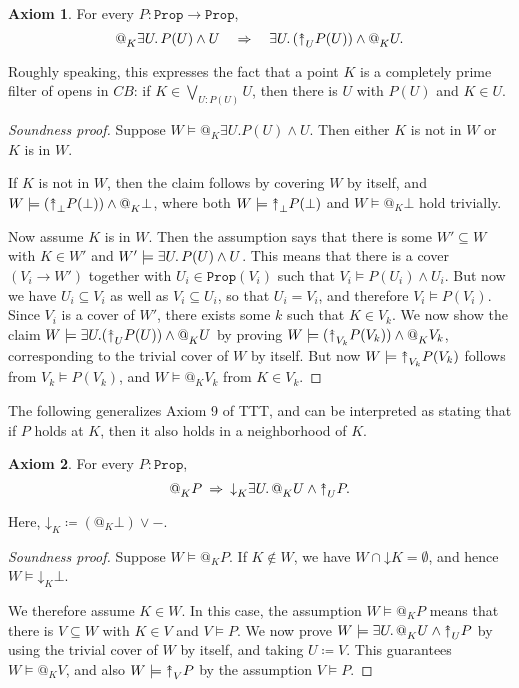\documentclass[11pt, oneside, article]{memoir}
\makeatletter
\theoremstyle{plain}
\theoremstyle{definition}
\newtheorem{axiom}{Axiom}
\theoremstyle{remark}
\newenvironment{soundproof}{\begin{proof}[Soundness proof]}{\end{proof}}
\newcommand{\const}[1]{\mathtt{#1}}
\newcommand{\Prop}{\const{Prop}}
\newcommand{\BaseSpace}{B}
\newcommand{\AtSymbol}{{@}}
\newcommand{\SeeSymbol}{{\down}}  %
\newcommand{\InSymbol}{{\upclose}}%
\newcommand{\At}[2][]{\AtSymbol^{#1}_{#2}}
\newcommand{\See}[2][]{\SeeSymbol^{#1}_{#2}}
\newcommand{\In}[2][]{\InSymbol^{#1}_{#2}}
\newcommand{\upclose}{{\rotatebox[origin=c]{90}{$\twoheadrightarrow$}}}
\newcommand{\down}{\mathord{\downarrow}}
\newcommand{\imp}{\Rightarrow}
\makeatother
\begin{document}
\begin{axiom}\label{axiom:completely_prime}
For every $P : \Prop \to \Prop$,
\[
	\At{K} \exists U\ldotp P(U) \wedge U \quad \imp \quad \exists U\ldotp (\In{U} P(U)) \wedge \At{K} U.
\]
\end{axiom}

Roughly speaking, this expresses the fact that a point $K$ is a completely prime filter of opens in $C\BaseSpace$: if $K\in \bigvee_{U : P(U)} U$, then there is $U$ with $P(U)$ and $K\in U$.

\begin{soundproof}
    Suppose $W \models @_K \exists U. P(U) \wedge U$. Then either $K$ is not in $W$ or $K$ is in $W$.

    If $K$ is not in $W$, then the claim follows by covering $W$ by itself, and $W \models (\In{\bot} P(\bot)) \wedge \At{K} \bot$, where both $W \models \In{\bot} P(\bot)$ and $W \models \At{K} \bot$ hold trivially.

    Now assume $K$ is in $W$. Then the assumption says that there is some $W'\subseteq W$ with $K\in W'$ and $W' \models \exists U\ldotp P(U) \wedge U$. This means that there is a cover $(V_i\to W')$ together with $U_i\in\Prop(V_i)$ such that $V_i \models P(U_i) \wedge U_i$. But now we have $U_i \subseteq V_i$ as well as $V_i \subseteq U_i$, so that $U_i = V_i$, and therefore $V_i \models P(V_i)$. Since $V_i$ is a cover of $W'$, there exists some $k$ such that $K \in V_k$. We now show the claim $W \models \exists U. (\In{U} P(U)) \wedge \At{K} U$ by proving $W \models (\In{V_k} P(V_k)) \wedge \At{K} V_k$, corresponding to the trivial cover of $W$ by itself. But now $W \models \In{V_k} P(V_k)$ follows from $V_k \models P(V_k)$, and $W \models \At{K} V_k$ from $K\in V_k$.
\end{soundproof}

The following generalizes Axiom 9 of TTT, and can be interpreted as stating that if $P$ holds at $K$, then it also holds in a neighborhood of $K$.

\begin{axiom}\label{ax.at_to_nghbhd}
For every $P : \Prop$,
\[
	\At{K} P \: \imp \: \See{K} \exists U\ldotp \At{K} U \wedge \In{U} P.
\]
\end{axiom}

Here, $\See{K} \coloneqq (\At{K} \bot) \vee -$.

\begin{soundproof}
Suppose $W \models \At{K} P$. If $K\not\in W$, we have $W \cap \down K = \emptyset$, and hence $W \models \See{K} \bot$.

We therefore assume $K\in W$. In this case, the assumption $W \models \At{K} P$ means that there is $V\subseteq W$ with $K\in V$ and $V \models P$. We now prove $W \models \exists U\ldotp \At{K} U \wedge \In{U} P$ by using the trivial cover of $W$ by itself, and taking $U \coloneqq V$. This guarantees $W \models \At{K} V$, and also $W \models \In{V} P$ by the assumption $V \models P$.
\end{soundproof}
\end{document}
